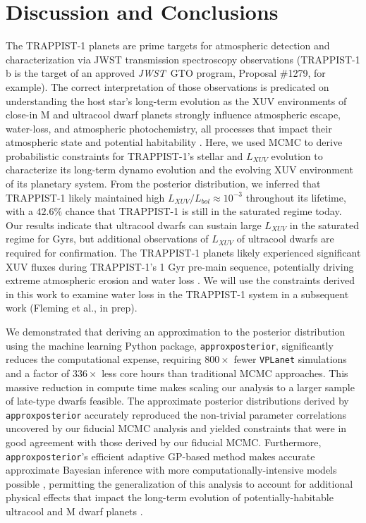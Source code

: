 \documentclass[twocolumn]{aastex62}
\newcommand{\vplanet}[0]{\texttt{VPLanet}\xspace}
\newcommand{\approxposterior}[0]{\texttt{approxposterior}\xspace}
\newcommand{\jwst}[0]{\textit{JWST}\xspace}
\begin{document}

\section{Discussion and Conclusions} \label{sec:discussion}

The TRAPPIST-1 planets are prime targets for atmospheric detection and characterization via JWST transmission spectroscopy observations (TRAPPIST-1 b is the target of an approved \jwst~GTO program, Proposal \#1279, for example). The correct interpretation of those observations is predicated on understanding the host star's long-term evolution as the XUV environments of close-in M and ultracool dwarf planets strongly influence atmospheric escape, water-loss, and atmospheric photochemistry, all processes that impact their atmospheric state and potential habitability \citep{Lammer2003,Ribas2005,MurrayClay2009,Luger2015,Airapetian2019}. Here, we used MCMC to derive probabilistic constraints for TRAPPIST-1's stellar and $L_{XUV}$ evolution to characterize its long-term dynamo evolution and the evolving XUV environment of its planetary system. From the posterior distribution, we inferred that TRAPPIST-1 likely maintained high $L_{XUV}/L_{bol} \approx 10^{-3}$ throughout its lifetime, with a $42.6\%$ chance that TRAPPIST-1 is still in the saturated regime today. Our results indicate that ultracool dwarfs can sustain large $L_{XUV}$ in the saturated regime for Gyrs, but additional observations of $L_{XUV}$ of ultracool dwarfs are required for confirmation. The TRAPPIST-1 planets likely experienced significant XUV fluxes during TRAPPIST-1's 1 Gyr pre-main sequence, potentially driving extreme atmospheric erosion and water loss \citep{Bolmont2017,Bourrier2017a}. We will use the constraints derived in this work to examine water loss in the TRAPPIST-1 system in a subsequent work (Fleming et al., in prep).

We demonstrated that deriving an approximation to the posterior distribution using the machine learning Python package, \approxposterior \citep{FlemingVanderPlas2018}, significantly reduces the computational expense, requiring $800\times$ fewer \vplanet simulations and a factor of $336\times$ less core hours than traditional MCMC approaches. This massive reduction in compute time makes scaling our analysis to a larger sample of late-type dwarfs feasible. The approximate posterior distributions derived by \approxposterior accurately reproduced the non-trivial parameter correlations uncovered by our fiducial MCMC analysis and yielded constraints that were in good agreement with those derived by our fiducial MCMC. Furthermore, \approxposterior's efficient adaptive GP-based method makes accurate approximate Bayesian inference with more computationally-intensive models possible \citep{Kandasamy2015}, permitting the generalization of this analysis to account for additional physical effects that impact the long-term evolution of potentially-habitable ultracool and M dwarf planets \citep[e.g. tidal heating,][]{Barnes2017}. 
\end{document}
